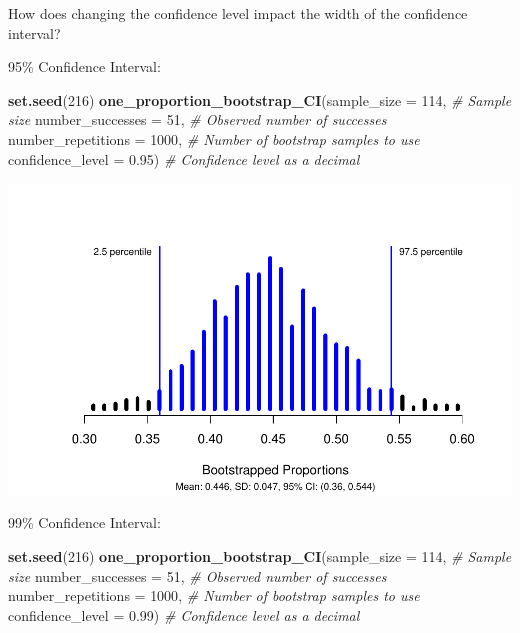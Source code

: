 \documentclass[
]{report}
\newenvironment{Shaded}{\begin{snugshade}}{\end{snugshade}}
\newcommand{\AttributeTok}[1]{\textcolor[rgb]{0.13,0.29,0.53}{#1}}
\newcommand{\CommentTok}[1]{\textcolor[rgb]{0.56,0.35,0.01}{\textit{#1}}}
\newcommand{\DecValTok}[1]{\textcolor[rgb]{0.00,0.00,0.81}{#1}}
\newcommand{\FloatTok}[1]{\textcolor[rgb]{0.00,0.00,0.81}{#1}}
\newcommand{\FunctionTok}[1]{\textcolor[rgb]{0.13,0.29,0.53}{\textbf{#1}}}
\newcommand{\NormalTok}[1]{#1}
\begin{document}
\vspace{0.8in}

\newpage

How does changing the confidence level impact the width of the confidence interval?

95\% Confidence Interval:

\begin{Shaded}
\begin{Highlighting}[]
\FunctionTok{set.seed}\NormalTok{(}\DecValTok{216}\NormalTok{)}
\FunctionTok{one\_proportion\_bootstrap\_CI}\NormalTok{(}\AttributeTok{sample\_size =} \DecValTok{114}\NormalTok{, }\CommentTok{\# Sample size}
                    \AttributeTok{number\_successes =} \DecValTok{51}\NormalTok{, }\CommentTok{\# Observed number of successes}
                    \AttributeTok{number\_repetitions =} \DecValTok{1000}\NormalTok{, }\CommentTok{\# Number of bootstrap samples to use}
                    \AttributeTok{confidence\_level =} \FloatTok{0.95}\NormalTok{) }\CommentTok{\# Confidence level as a decimal}
\end{Highlighting}
\end{Shaded}

\begin{center}\includegraphics[width=0.7\linewidth]{03-VN03-EDA_OneCatSimulation_files/figure-latex/unnamed-chunk-10-1} \end{center}

99\% Confidence Interval:

\begin{Shaded}
\begin{Highlighting}[]
\FunctionTok{set.seed}\NormalTok{(}\DecValTok{216}\NormalTok{)}
\FunctionTok{one\_proportion\_bootstrap\_CI}\NormalTok{(}\AttributeTok{sample\_size =} \DecValTok{114}\NormalTok{, }\CommentTok{\# Sample size}
                    \AttributeTok{number\_successes =} \DecValTok{51}\NormalTok{, }\CommentTok{\# Observed number of successes}
                    \AttributeTok{number\_repetitions =} \DecValTok{1000}\NormalTok{, }\CommentTok{\# Number of bootstrap samples to use}
                    \AttributeTok{confidence\_level =} \FloatTok{0.99}\NormalTok{) }\CommentTok{\# Confidence level as a decimal}
\end{Highlighting}
\end{Shaded}
\end{document}
